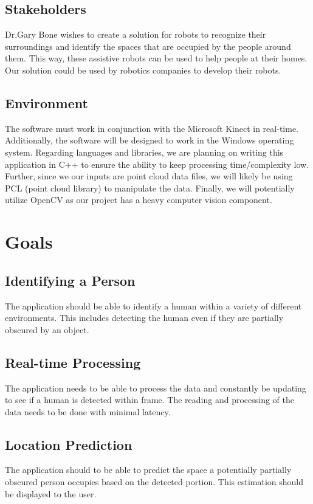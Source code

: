 \documentclass{article}
\begin{document}
\subsection{Stakeholders}
Dr.Gary Bone wishes to create a solution for robots to recognize their surroundings and identify the spaces that are occupied by the people around them. This way, these assistive robots can be used to help people at their homes. Our solution could be used by robotics companies to develop their robots.

\subsection{Environment}
The software must work in conjunction with the Microsoft Kinect in real-time. Additionally, the software will be designed to work in the Windows operating system. Regarding languages and libraries, we are planning on writing this application in C++ to ensure the ability to keep processing time/complexity low. Further, since we our inputs are point cloud data files, we will likely be using PCL (point cloud library) to manipulate the data. Finally, we will potentially utilize OpenCV as our project has a heavy computer vision component.

\newpage
\section{Goals}   

\subsection{Identifying a Person}
The application should be able to identify a human within a variety of different environments. This includes detecting the human even if they are partially obscured by an object.

\subsection{Real-time Processing}
The application needs to be able to process the data and constantly be updating to see if a human is detected within frame. The reading and processing of the data needs to be done with minimal latency.

\subsection{Location Prediction}
The application should to be able to predict the space a potentially partially obscured person occupies based on the detected portion. This estimation should be displayed to the user.
\end{document}
